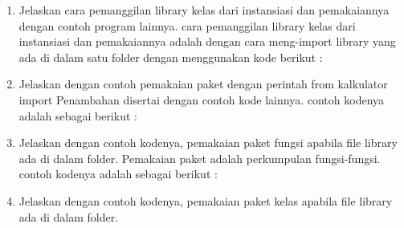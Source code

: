 \begin{enumerate}
    \item Jelaskan cara pemanggilan library kelas dari instansiasi dan pemakaiannya dengan contoh program lainnya.
cara pemanggilan  library kelas dari instansiasi dan pemakaiannya adalah dengan cara meng-import library yang ada di dalam satu folder dengan menggunakan kode berikut :
 

    \item Jelaskan dengan contoh pemakaian paket dengan perintah from kalkulator import Penambahan disertai dengan contoh kode lainnya.
contoh kodenya adalah sebagai berikut :
 

    \item Jelaskan dengan contoh kodenya, pemakaian paket fungsi apabila ﬁle library ada di dalam folder.
 Pemakaian paket adalah perkumpulan fungsi-fungsi. contoh kodenya adalah sebagai berikut :
 

    \item Jelaskan dengan contoh kodenya, pemakaian paket kelas apabila ﬁle library ada di dalam folder.
 

\end{enumerate}


